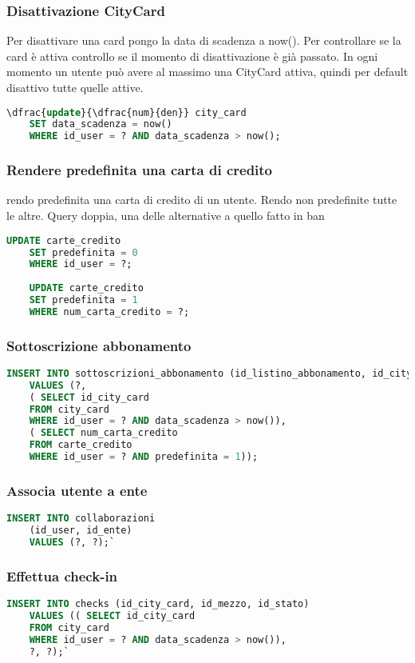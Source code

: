 \subsubsection{Disattivazione CityCard}
Per disattivare una card pongo la data di scadenza a now().
Per controllare se la card è attiva controllo se il momento di disattivazione è già passato.
In ogni momento un utente può avere al massimo una CityCard attiva,
quindi per default disattivo tutte quelle attive.
\begin{lstlisting}[language=SQL]
	\dfrac{update}{\dfrac{num}{den}} city_card
	SET data_scadenza = now()
	WHERE id_user = ? AND data_scadenza > now();
\end{lstlisting}

\subsubsection{Rendere predefinita una carta di credito}
rendo predefinita una carta di credito di un utente. Rendo non predefinite tutte le altre. Query doppia, una delle alternative a quello fatto in ban
\begin{lstlisting}[language=SQL]
	UPDATE carte_credito
	SET predefinita = 0
	WHERE id_user = ?;
	
	UPDATE carte_credito
	SET predefinita = 1
	WHERE num_carta_credito = ?;
\end{lstlisting}

\subsubsection{Sottoscrizione abbonamento}
\begin{lstlisting}[language=SQL]
	INSERT INTO sottoscrizioni_abbonamento (id_listino_abbonamento, id_city_card, num_carta_credito) 
	VALUES (?, 
	( SELECT id_city_card
	FROM city_card
	WHERE id_user = ? AND data_scadenza > now()), 
	( SELECT num_carta_credito 
	FROM carte_credito
	WHERE id_user = ? AND predefinita = 1));
\end{lstlisting}

\subsubsection{Associa utente a ente}
\begin{lstlisting}[language=SQL]
	INSERT INTO collaborazioni 
	(id_user, id_ente) 
	VALUES (?, ?);`
\end{lstlisting}

\subsubsection{Effettua check-in}
\begin{lstlisting}[language=SQL]
	INSERT INTO checks (id_city_card, id_mezzo, id_stato) 
	VALUES (( SELECT id_city_card
	FROM city_card
	WHERE id_user = ? AND data_scadenza > now()), 
	?, ?);`
\end{lstlisting}

